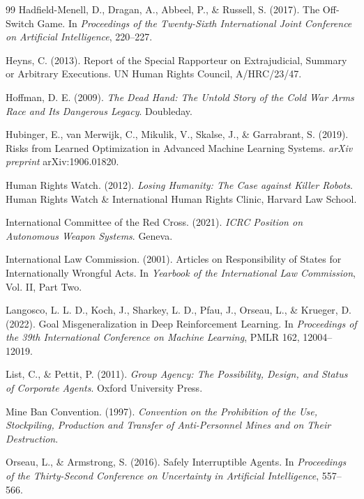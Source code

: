 \documentclass[11pt]{article}
\begin{document}
\begin{thebibliography}{99}
Hadfield-Menell, D., Dragan, A., Abbeel, P., \& Russell, S. (2017). The Off-Switch Game. In \textit{Proceedings of the Twenty-Sixth International Joint Conference on Artificial Intelligence}, 220--227.

Heyns, C. (2013). Report of the Special Rapporteur on Extrajudicial, Summary or Arbitrary Executions. UN Human Rights Council, A/HRC/23/47.

Hoffman, D. E. (2009). \textit{The Dead Hand: The Untold Story of the Cold War Arms Race and Its Dangerous Legacy}. Doubleday.

Hubinger, E., van Merwijk, C., Mikulik, V., Skalse, J., \& Garrabrant, S. (2019). Risks from Learned Optimization in Advanced Machine Learning Systems. \textit{arXiv preprint} arXiv:1906.01820.

Human Rights Watch. (2012). \textit{Losing Humanity: The Case against Killer Robots}. Human Rights Watch \& International Human Rights Clinic, Harvard Law School.

International Committee of the Red Cross. (2021). \textit{ICRC Position on Autonomous Weapon Systems}. Geneva.

International Law Commission. (2001). Articles on Responsibility of States for Internationally Wrongful Acts. In \textit{Yearbook of the International Law Commission}, Vol. II, Part Two.

Langosco, L. L. D., Koch, J., Sharkey, L. D., Pfau, J., Orseau, L., \& Krueger, D. (2022). Goal Misgeneralization in Deep Reinforcement Learning. In \textit{Proceedings of the 39th International Conference on Machine Learning}, PMLR 162, 12004--12019.

List, C., \& Pettit, P. (2011). \textit{Group Agency: The Possibility, Design, and Status of Corporate Agents}. Oxford University Press.

Mine Ban Convention. (1997). \textit{Convention on the Prohibition of the Use, Stockpiling, Production and Transfer of Anti-Personnel Mines and on Their Destruction}.

Orseau, L., \& Armstrong, S. (2016). Safely Interruptible Agents. In \textit{Proceedings of the Thirty-Second Conference on Uncertainty in Artificial Intelligence}, 557--566.


\end{thebibliography}
\end{document}

